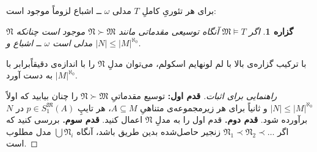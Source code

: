 \documentclass[12pt,a4paper]{article}
\theoremstyle{colorhead}
\newtheorem{prop}[thm]{گزاره}
\begin{document}
برای هر تئوریِ کاملِ
$T$
مدلی 
$\omega$ 
ــ
اشباع لزوماً موجود است:
\begin{prop}
اگر
$\mathfrak{M}\models T$
آنگاه توسیعی مقدماتی مانند
$\mathfrak{N}\succ \mathfrak{M}$
موجود است چنانکه 
$\mathfrak{N}$
مدلی است
$\omega$ ــ
اشباع و 
$|N|\leq |M|^{\aleph_0}$.
\end{prop}
با ترکیب گزاره‌ی بالا با لم لونهایم اسکولم، می‌توان مدلِ
$\mathfrak{N}$
را با اندازه‌ی دقیقاً‌برابر با
$|M|^{\aleph_0}$
به دست آورد.
\begin{proof}[راهنمایی برای اثبات]
\hfill \newline
\textbf{قدم اول:}
توسیع مقدماتیِ
$\mathfrak{N}\succ \mathfrak{M}$
را چنان بیابید که
اولاً
$|N|\leq |M|^{\aleph_0}$
و ثانیاً برای هر زیرمجموعه‌ی متناهیِ
$A\subseteq M$،
هر تایپِ
$p\in S_1^\mathfrak{M}(A)$
در
$N$
برآورده شود. 
\newline
\textbf{قدم دوم.}
قدم اول را به مدلِ
$\mathfrak{N}$
اعمال کنید.
\newline
\textbf{قدم سوم.}
بررسی کنید که
اگر
$\mathfrak{N}_1\prec \mathfrak{N}_2\prec \ldots$
زنجیر حاصل‌شده بدین طریق باشد، آنگاه
$\bigcup \mathfrak{N}_i$
مدل مطلوب است. 
\end{proof}
\end{document}
